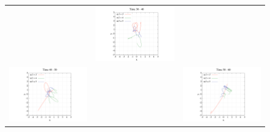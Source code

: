 \documentclass[11pt,a4paper,oneside,onecolumn]{jreport}
\begin{document}
\begin{figure}[H]
\begin{tabular}{ccc}
\begin{minipage}[t]{0.1\hsize}
\end{minipage} &
\begin{minipage}[t]{0.45\hsize}
\centering
\includegraphics[width=8cm]{./image/pythagoras_orbit_30to40.pdf}
\end{minipage}\\
%
\begin{minipage}[t]{0.45\hsize}
\centering
\includegraphics[width=8cm]{./image/pythagoras_orbit_40to50.pdf}
\end{minipage} &
\begin{minipage}[t]{0.1\hsize}
\end{minipage} &
\begin{minipage}[t]{0.45\hsize}
\centering
\includegraphics[width=8cm]{./image/pythagoras_orbit_50to60.pdf}
\end{minipage}\\

\end{tabular}
\end{figure}
\end{document}
